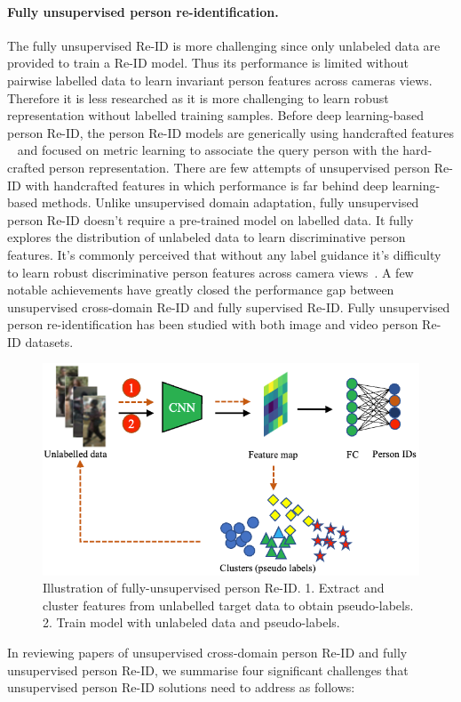 \documentclass[a4paper,fleqn]{cas-dc}
\begin{document}
\paragraph{Fully unsupervised person re-identification.}  The fully unsupervised Re-ID is more challenging since only unlabeled data are provided to train a Re-ID model. Thus its performance is limited without pairwise labelled data to learn invariant person features across cameras views. Therefore it is less researched as it is more challenging to learn robust representation without labelled training samples. Before deep learning-based person Re-ID, the person Re-ID models are generically using handcrafted features ~\cite{liao_person_2015,zheng_scalable_2015} and focused on metric learning to associate the query person with the hard-crafted person representation. There are few attempts of unsupervised person Re-ID with handcrafted features in which performance is far behind deep learning-based methods. Unlike unsupervised domain adaptation, fully unsupervised person Re-ID doesn't require a pre-trained model on labelled data. It fully explores the distribution of unlabeled data to learn discriminative person features. It's commonly perceived that without any label guidance it's difficulty to learn robust discriminative person features across camera views~\cite{kodirov_dictionary_2015,wang_unsupervised_2014,wang_towards_2016,yu_cross-view_2017}. A few notable achievements have greatly closed the performance gap between unsupervised cross-domain Re-ID and fully supervised Re-ID. Fully unsupervised person re-identification has been studied with both image and video person Re-ID datasets.
\begin{figure}[t]
\begin{center}
\includegraphics [width=.75\linewidth]{fullyclustering.PNG}
\end{center}
  \caption{Illustration of fully-unsupervised person Re-ID. 1. Extract and cluster features from unlabelled target data to obtain pseudo-labels. 2. Train model with unlabeled data and pseudo-labels.}
\label{fig:fullyclustering}
\end{figure}
In reviewing papers of unsupervised cross-domain person Re-ID and fully unsupervised person Re-ID, we summarise four significant challenges that unsupervised person Re-ID solutions need to address as follows: 
\end{document}

